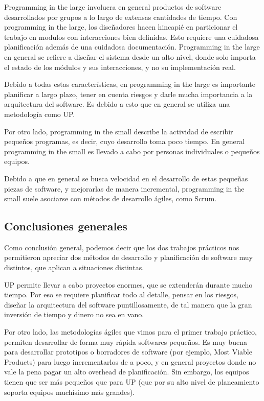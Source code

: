 Programming in the large involucra en general productos de software desarrollados por grupos a lo largo de extensas cantidades de tiempo. Con programming in the large, los diseñadores hacen hincapié en particionar el trabajo en modulos con interacciones bien definidas. Esto requiere una cuidadosa planificación además de una cuidadosa documentación. Programming in the large en general se refiere a diseñar el sistema desde un alto nivel, donde solo importa el estado de los módulos y sus interacciones, y no su implementación real.

Debido a todas estas características, en programming in the large es importante planificar a largo plazo, tener en cuenta riesgos y darle mucha importancia a la arquitectura del software. Es debido a esto que en general se utiliza una metodología como UP. 

Por otro lado, programming in the small describe la actividad de escribir pequeños programas, es decir, cuyo desarrollo toma poco tiempo. En general programming in the small es llevado a cabo por personas individuales o pequeños equipos.

Debido a que en general se busca velocidad en el desarrollo de estas pequeñas piezas de software, y mejorarlas de manera incremental, programming in the small suele asociarse con métodos de desarrollo ágiles, como Scrum.

\subsection{Conclusiones generales}

Como conclusión general, podemos decir que los dos trabajos prácticos nos permitieron apreciar dos m\'etodos de desarrollo y planificación de software muy distintos, que aplican a situaciones distintas. 

UP permite llevar a cabo proyectos enormes, que se extenderán durante mucho tiempo. Por eso se requiere planificar todo al detalle, pensar en los riesgos, diseñar la arquitectura del software puntillosamente, de tal manera que la gran inversión de tiempo y dinero no sea en vano.

Por otro lado, las metodologías ágiles que vimos para el primer trabajo práctico, permiten desarrollar de forma muy rápida softwares pequeños. Es muy buena para desarrollar prototipos o borradores de software (por ejemplo, Most Viable Products) para luego incrementarlos de a poco, y en general proyectos donde no vale la pena pagar un alto overhead de planificación. Sin embargo, los equipos tienen que ser más pequeños que para UP (que por su alto nivel de planeamiento soporta equipos muchísimo más grandes).
